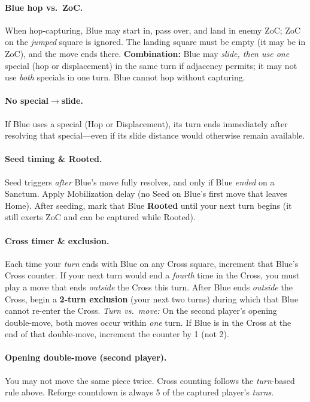 \documentclass[11pt]{article}
\begin{document}
\paragraph{Blue hop vs.\ ZoC.}
When hop-capturing, Blue may start in, pass over, and land in enemy ZoC; ZoC on the \emph{jumped} square is ignored. The landing square must be empty (it may be in ZoC), and the move ends there.
\textbf{Combination:} Blue may \emph{slide, then use one} special (hop or displacement) in the same turn if adjacency permits; it may not use \emph{both} specials in one turn. Blue cannot hop without capturing.

\paragraph{No special$\rightarrow$slide.}
If Blue uses a special (Hop or Displacement), its turn ends immediately after resolving that special---even if its slide distance would otherwise remain available.

\paragraph{Seed timing \& Rooted.}
Seed triggers \emph{after} Blue's move fully resolves, and only if Blue \emph{ended} on a Sanctum. Apply Mobilization delay (no Seed on Blue's first move that leaves Home). After seeding, mark that Blue \textbf{Rooted} until your next turn begins (it still exerts ZoC and can be captured while Rooted).

\paragraph{Cross timer \& exclusion.}
Each time your \emph{turn} ends with Blue on any Cross square, increment that Blue's Cross counter. If your next turn would end a \emph{fourth} time in the Cross, you must play a move that ends \emph{outside} the Cross this turn. After Blue ends \emph{outside} the Cross, begin a \textbf{2-turn exclusion} (your next two turns) during which that Blue cannot re-enter the Cross.
\emph{Turn vs.\ move:} On the second player's opening double-move, both moves occur within \emph{one} turn. If Blue is in the Cross at the end of that double-move, increment the counter by 1 (not 2).

\paragraph{Opening double-move (second player).}
You may not move the same piece twice. Cross counting follows the \emph{turn}-based rule above. Reforge countdown is always 5 of the captured player's \emph{turns}.
\end{document}
